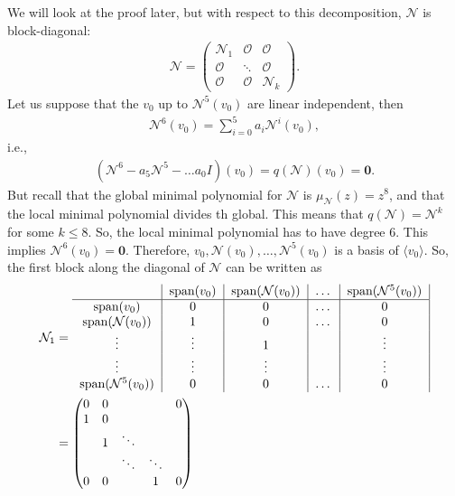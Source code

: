 \documentclass{article}
\theoremstyle{definition}
\newcommand{\xpan}{\text{span}}
\begin{document}
We will look at the proof later, but with respect to this decomposition, $\mathcal{N}$ is block-diagonal:
\begin{align*}
\mathcal{N}= \begin{pmatrix}
\mathcal{N}_1 & \mathcal{O} & \mathcal{O}\\
\mathcal{O}& \ddots & \mathcal{O}\\
\mathcal{O} & \mathcal{O} & \mathcal{N}_k
\end{pmatrix}.
\end{align*}
Let us suppose that the $v_0$ up to $\mathcal{N}^5(v_0)$ are linear independent, then 
\begin{align*}
\mathcal{N}^6(v_0) = \sum^5_{i=0}a_i \mathcal{N}^i (v_0),
\end{align*}
i.e.,
\begin{align*}
(\mathcal{N}^6 - a_5\mathcal{N}^5 - \dots a_0 I)(v_0) =  q(\mathcal{N})(v_0)  = \mathbf{0}.
\end{align*}
But recall that the global minimal polynomial for $\mathcal{N}$ is $\mu_\mathcal{N}(z) = z^8$, and that the local minimal polynomial divides th global. This means that $q(\mathcal{N}) = \mathcal{N}^k$ for some $k \leq 8$. So, the local minimal polynomial has to have degree 6. This implies $\mathcal{N}^6(v_0) = \mathbf{0}$. Therefore, $v_0 ,\mathcal{N}(v_0),\dots , \mathcal{N}^5(v_0)$ is a basis of $\langle v_0 \rangle$. So, the first block along the diagonal of $\mathcal{N}$ can be written as 
\begin{align*}
\mathcal{N}_1 &= 
\begin{tabular}{c|c|c|c|c|}
& $\xpan(v_0)$ & $\xpan(\mathcal{N}(v_0))$ & \dots & $\xpan(\mathcal{N}^5(v_0))$\\
\hline
$\xpan(v_0)$& $0$ & $0$  & \dots & 0\\	
$\xpan(\mathcal{N}(v_0))$& $1$ & $0$ &\dots& $0$\\
$\vdots$ &\vdots&1&&\vdots \\
$\vdots$ &\vdots&\vdots&& \vdots\\
$\xpan(\mathcal{N}^5(v_0))$ &0 &0 & \dots& 0
\end{tabular}\\
&= \begin{pmatrix}
0 & 0 &  && 0\\
1 & 0 &  && \\
 & 1 & \ddots && \\
 &  & \ddots &\ddots&\\
0 & 0 &  &1& 0
\end{pmatrix}
\end{align*}
\end{document}
